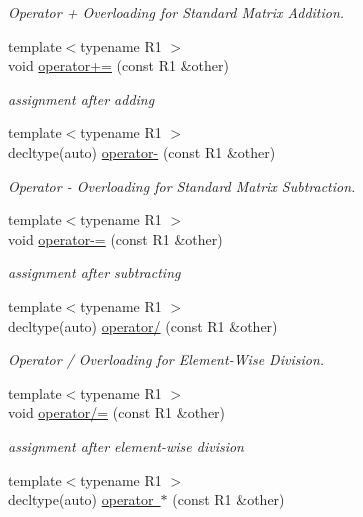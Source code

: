 \begin{DoxyCompactItemize}
\begin{DoxyCompactList}\small\item\em Operator + Overloading for Standard Matrix Addition. \end{DoxyCompactList}\item 
{\footnotesize template$<$typename R1 $>$ }\\void \mbox{\hyperlink{classlazy__matrix_ad095e5ee3870ca98a267961e260321ce}{operator+=}} (const R1 \&other)
\begin{DoxyCompactList}\small\item\em assignment after adding \end{DoxyCompactList}\item 
{\footnotesize template$<$typename R1 $>$ }\\decltype(auto) \mbox{\hyperlink{classlazy__matrix_a04ef62e9f2c4395ad0a9e00a0180df9e}{operator-\/}} (const R1 \&other)
\begin{DoxyCompactList}\small\item\em Operator -\/ Overloading for Standard Matrix Subtraction. \end{DoxyCompactList}\item 
{\footnotesize template$<$typename R1 $>$ }\\void \mbox{\hyperlink{classlazy__matrix_a9b8a37284dfa4be9423322f409b81c63}{operator-\/=}} (const R1 \&other)
\begin{DoxyCompactList}\small\item\em assignment after subtracting \end{DoxyCompactList}\item 
{\footnotesize template$<$typename R1 $>$ }\\decltype(auto) \mbox{\hyperlink{classlazy__matrix_ad63bef3225861a4845772934bed6dfa4}{operator/}} (const R1 \&other)
\begin{DoxyCompactList}\small\item\em Operator / Overloading for Element-\/\+Wise Division. \end{DoxyCompactList}\item 
{\footnotesize template$<$typename R1 $>$ }\\void \mbox{\hyperlink{classlazy__matrix_aa19e114755a98ae28c55cc07e06a3f1e}{operator/=}} (const R1 \&other)
\begin{DoxyCompactList}\small\item\em assignment after element-\/wise division \end{DoxyCompactList}\item 
{\footnotesize template$<$typename R1 $>$ }\\decltype(auto) \mbox{\hyperlink{classlazy__matrix_a0a6d3ba52a1f25250794e978a4ef11d7}{operator $\ast$}} (const R1 \&other)

\end{DoxyCompactItemize}
